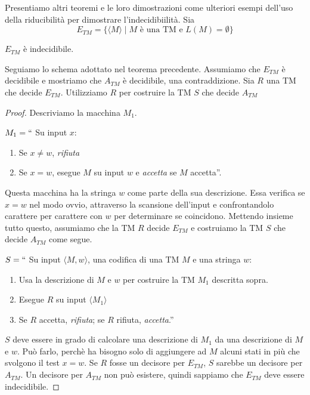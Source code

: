 \documentclass[12pt]{report}
\newcounter{theorem}
\begin{document}
Presentiamo altri teoremi e le loro dimostrazioni come ulteriori esempi dell'uso della riducibilità per dimostrare l'indecidibiilità. Sia
\[
E_{TM} = \{\langle M \rangle \mid M \text{ è una TM e }L(M) = \emptyset \}
\]
\begin{theorem}{}{}
	$E_{TM}$ è indecidibile.
\end{theorem}
Seguiamo lo schema adottato nel teorema precedente. Assumiamo che $E_{TM}$ è decidibile e mostriamo che $A_{TM}$ è decidibile, una contraddizione. Sia $R$ una TM che decide $E_{TM}$. Utilizziamo $R$ per costruire la TM $S$ che decide $A_{TM}$
\begin{proof}
Descriviamo la macchina $M_1$.

$M_1 = ``$ Su input $x$:
\begin{enumerate}
	\item Se $x \neq w$, \textit{rifiuta}
	\item Se $x = w$, esegue $M$ su input $w$ e \textit{accetta} se $M$ accetta''.
\end{enumerate}
Questa macchina ha la stringa $w$ come parte della sua descrizione. Essa verifica se $x = w$ nel modo ovvio, attraverso la scansione dell'input e confrontandolo carattere per carattere con $w$ per determinare se coincidono. Mettendo insieme tutto questo, assumiamo che la TM $R$ decide $E_{TM}$ e costruiamo la TM $S$ che decide $A_{TM}$ come segue.

$S = ``$ Su input $\langle M, w \rangle$, una codifica di una TM $M$ e una stringa $w$:
\begin{enumerate}
	\item Usa la descrizione di $M$ e $w$ per costruire la TM $M_1$ descritta sopra.
	\item Esegue $R$ su input $\langle M_1 \rangle$
	\item Se $R$ accetta, \textit{rifiuta}; se $R$ rifiuta, \textit{accetta}.''
\end{enumerate}

$S$ deve essere in grado di calcolare una descrizione di $M_1$ da una descrizione di $M$ e $w$. Può farlo, perchè ha bisogno solo di aggiungere ad $M$ alcuni stati in più che svolgono il test $x = w$. Se $R$ fosse un decisore per $E_{TM}$, $S$ sarebbe un decisore per $A_{TM}$. Un decisore per $A_{TM}$ non può esistere, quindi sappiamo che $E_{TM}$ deve essere indecidibile.
\end{proof}
\end{document}
